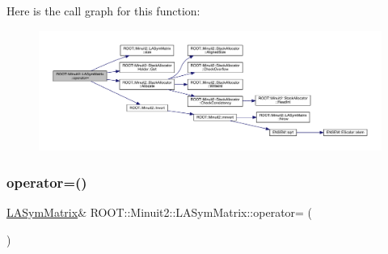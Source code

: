 Here is the call graph for this function\+:
\nopagebreak
\begin{figure}[H]
\begin{center}
\leavevmode
\includegraphics[width=350pt]{d3/d72/classROOT_1_1Minuit2_1_1LASymMatrix_a95fd77b55f726095a231817852fceb7d_cgraph}
\end{center}
\end{figure}
\mbox{\label{classROOT_1_1Minuit2_1_1LASymMatrix_a166f84f8396e20c14225ae139ba6af25}} 
\subsubsection{\texorpdfstring{operator=()}{operator=()}\hspace{0.1cm}{\footnotesize\ttfamily [19/21]}}
{\footnotesize\ttfamily \mbox{\hyperlink{classROOT_1_1Minuit2_1_1LASymMatrix}{L\+A\+Sym\+Matrix}}\& R\+O\+O\+T\+::\+Minuit2\+::\+L\+A\+Sym\+Matrix\+::operator= (\begin{DoxyParamCaption}\item[{const \mbox{\hyperlink{classROOT_1_1Minuit2_1_1ABObj}{A\+B\+Obj}}$<$ \mbox{\hyperlink{classROOT_1_1Minuit2_1_1sym}{sym}}, \mbox{\hyperlink{classROOT_1_1Minuit2_1_1VectorOuterProduct}{Vector\+Outer\+Product}}$<$ \mbox{\hyperlink{classROOT_1_1Minuit2_1_1ABObj}{A\+B\+Obj}}$<$ \mbox{\hyperlink{classROOT_1_1Minuit2_1_1vec}{vec}}, \mbox{\hyperlink{classROOT_1_1Minuit2_1_1LAVector}{L\+A\+Vector}}, double $>$, double $>$, double $>$ \&}]{ }\end{DoxyParamCaption})}

\mbox{\label{classROOT_1_1Minuit2_1_1LASymMatrix_a6d385d24fe98b336532837ad39f5c615}} 
